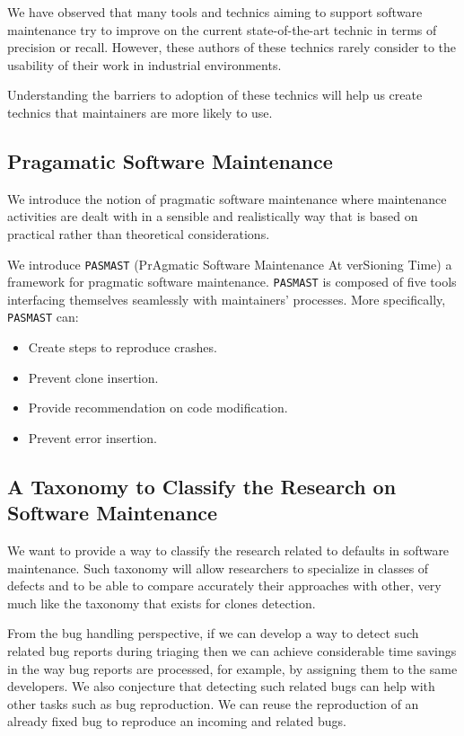 We have observed that many tools and technics aiming to support software maintenance try to improve on the current state-of-the-art technic in terms of precision or recall.
However, these authors of these technics rarely consider to the usability of their work in industrial environments.

Understanding the barriers to adoption of these technics will help us create technics that maintainers are more likely to use.

\subsection{Pragamatic Software Maintenance}

We introduce the notion of pragmatic software maintenance where maintenance activities are dealt with in a sensible and realistically way that is based on practical rather than theoretical considerations.

We introduce {\tt PASMAST} (PrAgmatic Software Maintenance At verSioning Time) a framework for pragmatic software maintenance.
{\tt PASMAST} is composed of five tools interfacing themselves seamlessly with maintainers' processes.
More specifically, {\tt PASMAST} can:
\begin{itemize}
	\item Create steps to reproduce crashes.
	\item Prevent clone insertion.
	\item Provide recommendation on code modification.
	\item Prevent error insertion.
\end{itemize}

\subsection{A Taxonomy to Classify the Research on Software Maintenance}

We want to provide a way to classify the research related to defaults in software maintenance.
Such taxonomy will allow researchers to specialize in classes of defects and to be able to compare accurately their approaches with other, very much like the taxonomy that exists for clones detection\cite{CoryKapser}.

From the bug handling perspective, if we can develop a
way to detect such related bug reports during triaging then we can achieve considerable time savings in the way bug reports are processed, for example, by assigning them to the same developers.
We also conjecture that detecting such related bugs can help with other tasks such as bug reproduction.
We can reuse the reproduction of an already fixed bug to reproduce an incoming and related bugs.

